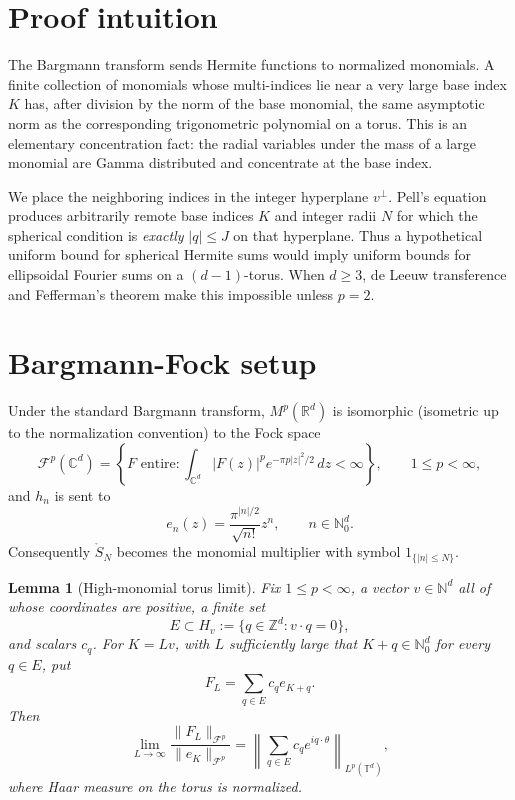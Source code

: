 \documentclass[11pt]{article}
\newtheorem{lemma}{Lemma}
\newcommand{\R}{\mathbb R}
\newcommand{\C}{\mathbb C}
\newcommand{\T}{\mathbb T}
\newcommand{\N}{\mathbb N}
\newcommand{\F}{\mathcal F}
\newcommand{\SN}{\mathring S}
\begin{document}
\section*{Proof intuition}

The Bargmann transform sends Hermite functions to normalized monomials.  A
finite collection of monomials whose multi-indices lie near a very large base
index $K$ has, after division by the norm of the base monomial, the same
asymptotic norm as the corresponding trigonometric polynomial on a torus.  This
is an elementary concentration fact: the radial variables under the mass of a
large monomial are Gamma distributed and concentrate at the base index.

We place the neighboring indices in the integer hyperplane $v^\perp$.  Pell's
equation produces arbitrarily remote base indices $K$ and integer radii $N$
for which the spherical condition is \emph{exactly}
$|q|\le J$ on that hyperplane.  Thus a hypothetical uniform bound for
spherical Hermite sums would imply uniform bounds for ellipsoidal Fourier sums
on a $(d-1)$-torus.  When $d\ge3$, de Leeuw transference and Fefferman's
theorem make this impossible unless $p=2$.

\section*{Bargmann-Fock setup}

Under the standard Bargmann transform, $M^p(\R^d)$ is isomorphic (isometric
up to the normalization convention) to the Fock space
\[
 \F^p(\C^d)=\left\{F\text{ entire}:
 \int_{\C^d}|F(z)|^p e^{-\pi p|z|^2/2}\,dz<\infty\right\},
 \qquad 1\le p<\infty,
\]
and $h_n$ is sent to
\[
 e_n(z)=\frac{\pi^{|n|/2}}{\sqrt{n!}}z^n,
 \qquad n\in\N_0^d.
\]
Consequently $\SN_N$ becomes the monomial multiplier with symbol
$1_{\{|n|\le N\}}$.

\begin{lemma}[High-monomial torus limit]\label{lem:focklimit}
Fix $1\le p<\infty$, a vector $v\in\N^d$ all of whose coordinates are
positive, a finite set
\[
 E\subset H_v:=\{q\in\mathbb Z^d:v\cdot q=0\},
\]
and scalars $c_q$.  For $K=Lv$, with $L$ sufficiently large that
$K+q\in\N_0^d$ for every $q\in E$, put
\[
 F_L=\sum_{q\in E}c_qe_{K+q}.
\]
Then
\[
 \lim_{L\to\infty}\frac{\|F_L\|_{\F^p}}{\|e_K\|_{\F^p}}
 =\left\|\sum_{q\in E}c_q e^{iq\cdot\theta}\right\|_{L^p(\T^d)},
\]
where Haar measure on the torus is normalized.
\end{lemma}
\end{document}
